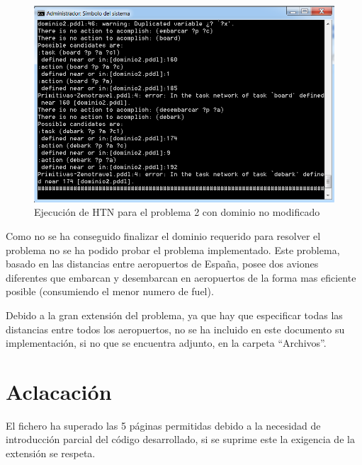 \begin{itemize}
	
	\begin{figure}[H]
		\centering
		\includegraphics[width=0.7\linewidth]{p41}
		\caption{Ejecución de HTN para el problema 2 con dominio no modificado}
		\label{fig:p21}
	\end{figure}
	
	Como no se ha conseguido finalizar el dominio requerido para resolver el problema no se ha podido probar el problema implementado. Este problema, basado en las distancias entre aeropuertos de España, posee dos aviones diferentes que embarcan y desembarcan en aeropuertos de la forma mas eficiente posible (consumiendo el menor numero de fuel).
	
	Debido a la gran extensión del problema, ya que hay que especificar todas las distancias entre todos los aeropuertos, no se ha incluido en este documento su implementación, si no que se encuentra adjunto, en la carpeta ``Archivos''.
	
	
	
	

\end{itemize}

\section{Aclacación}

El fichero ha superado las 5 páginas permitidas debido a la necesidad de introducción parcial del código desarrollado, si se suprime este la exigencia de la extensión se respeta.


